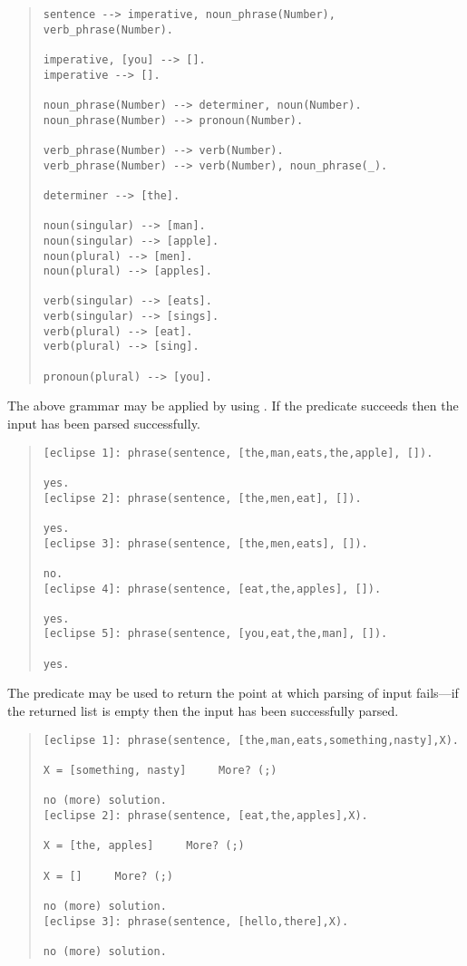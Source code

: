 \begin{quote}
\begin{verbatim}
sentence --> imperative, noun_phrase(Number), verb_phrase(Number).

imperative, [you] --> [].
imperative --> [].

noun_phrase(Number) --> determiner, noun(Number).
noun_phrase(Number) --> pronoun(Number).

verb_phrase(Number) --> verb(Number).
verb_phrase(Number) --> verb(Number), noun_phrase(_).

determiner --> [the].

noun(singular) --> [man].
noun(singular) --> [apple].
noun(plural) --> [men].
noun(plural) --> [apples].

verb(singular) --> [eats].
verb(singular) --> [sings].
verb(plural) --> [eat].
verb(plural) --> [sing].

pronoun(plural) --> [you].
\end{verbatim}
\end{quote}
The above grammar may be applied by
using . If the predicate
succeeds then the input has been parsed successfully.
\begin{quote}
\begin{verbatim}
[eclipse 1]: phrase(sentence, [the,man,eats,the,apple], []).

yes.
[eclipse 2]: phrase(sentence, [the,men,eat], []).

yes.
[eclipse 3]: phrase(sentence, [the,men,eats], []).

no.
[eclipse 4]: phrase(sentence, [eat,the,apples], []).

yes.
[eclipse 5]: phrase(sentence, [you,eat,the,man], []).

yes.
\end{verbatim}
\end{quote}
The predicate  may be
used to return the point at which
parsing of input fails---if the returned list is empty then the
input has been successfully parsed.

\begin{quote}
\begin{verbatim}
[eclipse 1]: phrase(sentence, [the,man,eats,something,nasty],X).

X = [something, nasty]     More? (;)

no (more) solution.
[eclipse 2]: phrase(sentence, [eat,the,apples],X).

X = [the, apples]     More? (;)

X = []     More? (;)

no (more) solution.
[eclipse 3]: phrase(sentence, [hello,there],X).

no (more) solution.
\end{verbatim}
\end{quote}

